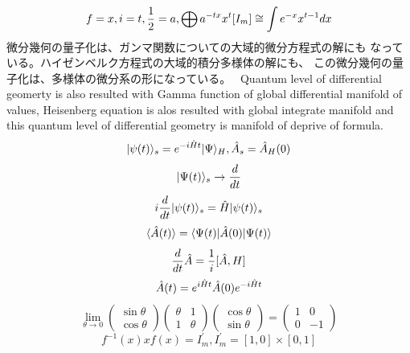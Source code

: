 \documentclass{jsarticle}
\begin{document}
{    $$ f = x, i = t, {1 \over 2} = a, \bigoplus a^{-t x}x^t [I_m]
     \cong \int e^{-x} x^{t - 1}dx $$
    微分幾何の量子化は、ガンマ関数についての大域的微分方程式の解にも
    なっている。ハイゼンベルク方程式の大域的積分多様体の解にも、
    この微分幾何の量子化は、多様体の微分系の形になっている。　
    Quantum level of differential geomerty is also resulted with
    Gamma function of global differential manifold of values, Heisenberg
    equation is alos resulted with global integrate manifold and this
    quantum level of differential geometry is manifold of deprive of formula.
    $$ |\psi(t)\rangle_s = e^{-i\Hat{H} t}|\Psi\rangle_{H},
    \Hat{A}_s = \Hat{A}_H(0) $$
    $$ |\Psi(t)\rangle_s \to {d \over dt} $$
    $$ i {d \over dt}|\psi (t) \rangle_s = \Hat{H}|\psi(t)\rangle_s $$
    $$ \langle\Hat{A}(t)\rangle = \langle\Psi(t)|\Hat{A}(0)|\Psi(t)\rangle  $$
    $$ {d \over dt}\Hat{A} = {1 \over i}[\Hat{A},H] $$
    $$ \Hat{A}(t) = e^{i\Hat{H}t}\Hat{A}(0)e^{-i\Hat{H}t} $$
    $$ \lim_{\theta \to 0} \begin{pmatrix} \sin \theta \\
    \cos \theta \end{pmatrix} \begin{pmatrix} \theta & 1 \\
    1 & \theta \end{pmatrix} \begin{pmatrix} \cos \theta \\
    \sin \theta \end{pmatrix} = \begin{pmatrix} 1 & 0 \\
    0 & - 1 \end{pmatrix} $$
    $$ f^{-1}(x) x f(x) = I^{'}_m, I^{'}_m = [1,0] \times [0,1] $$

}
\end{document}
